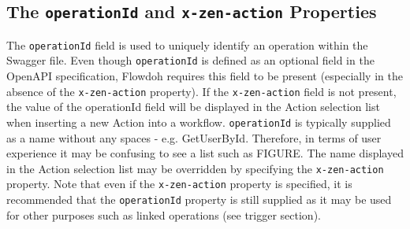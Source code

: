 \subsection{The \texttt{operationId} and \texttt{x-zen-action} Properties}
The \texttt{operationId} field is used to uniquely identify an operation within the Swagger file. Even though \texttt{operationId} is defined as an optional field in the OpenAPI specification, Flowdoh requires this field to be present (especially in the absence of the \texttt{x-zen-action} property). If the \texttt{x-zen-action} field is not present, the value of the operationId field will be displayed in the Action selection list when inserting a new Action into a workflow. \texttt{operationId} is typically supplied as a name without any spaces - e.g. GetUserById. Therefore, in terms of user experience it may be confusing to see a list such as FIGURE. The name displayed in the Action selection list may be overridden by specifying the \texttt{x-zen-action} property. Note that even if the \texttt{x-zen-action} property is specified, it is recommended that the \texttt{operationId} property is still supplied as it may be used for other purposes such as linked operations (see trigger section).